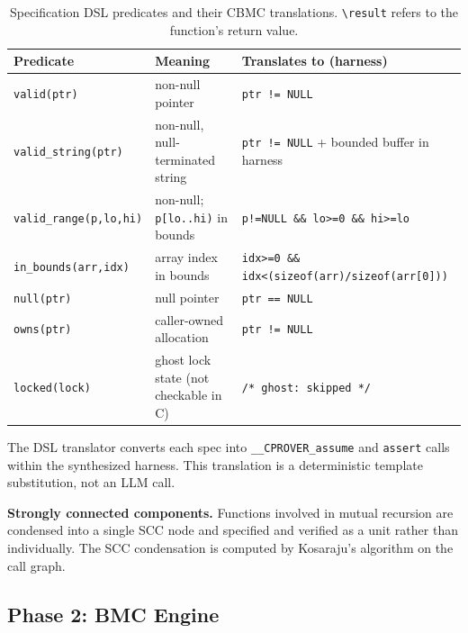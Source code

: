 \documentclass[11pt,a4paper]{article}
\begin{document}
\begin{table}[t]
\caption{Specification DSL predicates and their CBMC translations.
\texttt{{\textbackslash}result} refers to the function's return value.}
\label{tab:dsl}
\small
\begin{tabular}{p{3.5cm}p{3.0cm}p{4.5cm}}
\toprule
\textbf{Predicate} & \textbf{Meaning} & \textbf{Translates to (harness)} \\
\midrule
\texttt{valid(ptr)}
  & non-null pointer
  & \texttt{ptr != NULL} \\
\texttt{valid\_string(ptr)}
  & non-null, null-terminated string
  & \texttt{ptr != NULL} + bounded buffer in harness \\
\texttt{valid\_range(p,lo,hi)}
  & non-null; \texttt{p[lo..hi)} in bounds
  & \texttt{p!=NULL \&\& lo>=0 \&\& hi>=lo} \\
\texttt{in\_bounds(arr,idx)}
  & array index in bounds
  & \texttt{idx>=0 \&\& idx<(sizeof(arr)/sizeof(arr[0]))} \\
\texttt{null(ptr)}
  & null pointer
  & \texttt{ptr == NULL} \\
\texttt{owns(ptr)}
  & caller-owned allocation
  & \texttt{ptr != NULL} \\
\texttt{locked(lock)}
  & ghost lock state (not checkable in C)
  & \texttt{/* ghost: skipped */} \\
\bottomrule
\end{tabular}
\end{table}

The DSL translator converts each spec into \lstinline{__CPROVER_assume} and
\lstinline{assert} calls within the synthesized harness. This
translation is a deterministic template substitution, not an LLM call.

\smallskip\noindent\textbf{Strongly connected components.}
Functions involved in mutual recursion are condensed into a single SCC node
and specified and verified as a unit rather than individually. The SCC
condensation is computed by Kosaraju's algorithm on the call graph.

\subsection{Phase 2: BMC Engine}
\label{sec:bmc}
\end{document}
